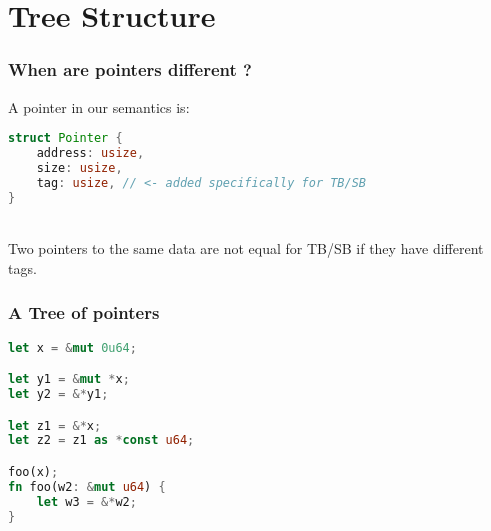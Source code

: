 \section{Tree Structure}


\begin{frame}[fragile, t]
    \frametitle{When are pointers different ?}
    A pointer in our semantics is:
    \begin{lstlisting}[language=rust]
struct Pointer {
    address: usize,
    size: usize,
    tag: usize, // <- added specifically for TB/SB
}
    \end{lstlisting}~\\

    Two pointers to the same data are not equal for TB/SB
    if they have different tags.
\end{frame}

\begin{frame}[fragile]
    \frametitle{A Tree of pointers}
    \begin{minipage}{0.45\textwidth}
        \begin{block}{}
            \begin{lstlisting}[language=rust]
let x = &mut 0u64;

let y1 = &mut *x;
let y2 = &*y1;

let z1 = &*x;
let z2 = z1 as *const u64;

foo(x);
fn foo(w2: &mut u64) {
    let w3 = &*w2;
}

            \end{lstlisting}
        \end{block}
    \end{minipage}
    ~\ ~\
    \begin{minipage}{0.45\textwidth}
        \begin{block}{}
        \end{block}
    \end{minipage}
\end{frame}

